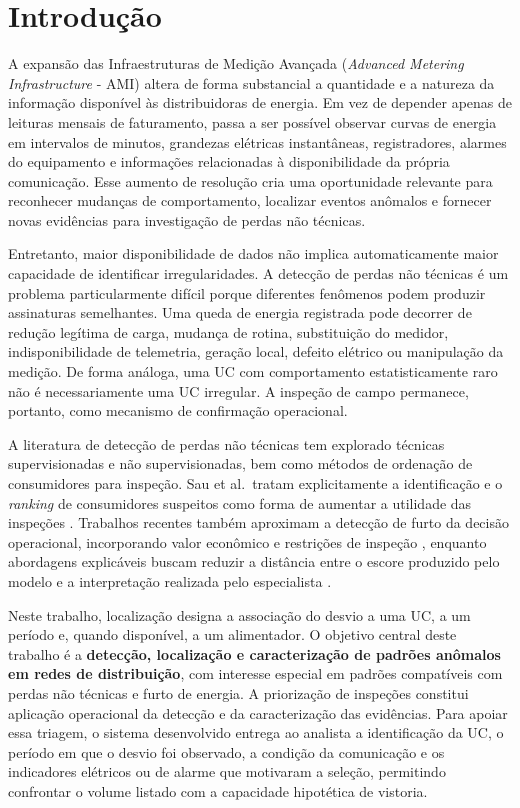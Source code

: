 \chapter{Introdução}\label{introduuxe7uxe3o}

A expansão das Infraestruturas de Medição Avançada (\emph{Advanced Metering Infrastructure} - AMI) altera de forma substancial a quantidade e a natureza da informação disponível às distribuidoras de energia. Em vez de depender apenas de leituras mensais de faturamento, passa a ser possível observar curvas de energia em intervalos de minutos, grandezas elétricas instantâneas, registradores, alarmes do equipamento e informações relacionadas à disponibilidade da própria comunicação. Esse aumento de resolução cria uma oportunidade relevante para reconhecer mudanças de comportamento, localizar eventos anômalos e fornecer novas evidências para investigação de perdas não técnicas.

Entretanto, maior disponibilidade de dados não implica automaticamente maior capacidade de identificar irregularidades. A detecção de perdas não técnicas é um problema particularmente difícil porque diferentes fenômenos podem produzir assinaturas semelhantes. Uma queda de energia registrada pode decorrer de redução legítima de carga, mudança de rotina, substituição do medidor, indisponibilidade de telemetria, geração local, defeito elétrico ou manipulação da medição. De forma análoga, uma UC com comportamento estatisticamente raro não é necessariamente uma UC irregular. A inspeção de campo permanece, portanto, como mecanismo de confirmação operacional.

A literatura de detecção de perdas não técnicas tem explorado técnicas supervisionadas e não supervisionadas, bem como métodos de ordenação de consumidores para inspeção. Sau et al.~tratam explicitamente a identificação e o \emph{ranking} de consumidores suspeitos como forma de aumentar a utilidade das inspeções \autocite{sau2023}. Trabalhos recentes também aproximam a detecção de furto da decisão operacional, incorporando valor econômico e restrições de inspeção \autocite{han2026}, enquanto abordagens explicáveis buscam reduzir a distância entre o escore produzido pelo modelo e a interpretação realizada pelo especialista \autocite{pavlidis2026}.

Neste trabalho, localização designa a associação do desvio a uma UC, a um período e, quando disponível, a um alimentador. O objetivo central deste trabalho é a \textbf{detecção, localização e caracterização de padrões anômalos em redes de distribuição}, com interesse especial em padrões compatíveis com perdas não técnicas e furto de energia. A priorização de inspeções constitui aplicação operacional da detecção e da caracterização das evidências. Para apoiar essa triagem, o sistema desenvolvido entrega ao analista a identificação da UC, o período em que o desvio foi observado, a condição da comunicação e os indicadores elétricos ou de alarme que motivaram a seleção, permitindo confrontar o volume listado com a capacidade hipotética de vistoria.


